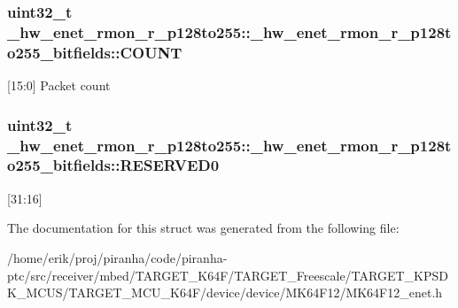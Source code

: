 \subsubsection[{\texorpdfstring{C\+O\+U\+NT}{COUNT}}]{\setlength{\rightskip}{0pt plus 5cm}uint32\+\_\+t \+\_\+hw\+\_\+enet\+\_\+rmon\+\_\+r\+\_\+p128to255\+::\+\_\+hw\+\_\+enet\+\_\+rmon\+\_\+r\+\_\+p128to255\+\_\+bitfields\+::\+C\+O\+U\+NT}\hypertarget{struct__hw__enet__rmon__r__p128to255_1_1__hw__enet__rmon__r__p128to255__bitfields_af3cc22b88abafadefec859c587a61730}{}\label{struct__hw__enet__rmon__r__p128to255_1_1__hw__enet__rmon__r__p128to255__bitfields_af3cc22b88abafadefec859c587a61730}
\mbox{[}15\+:0\mbox{]} Packet count 
\subsubsection[{\texorpdfstring{R\+E\+S\+E\+R\+V\+E\+D0}{RESERVED0}}]{\setlength{\rightskip}{0pt plus 5cm}uint32\+\_\+t \+\_\+hw\+\_\+enet\+\_\+rmon\+\_\+r\+\_\+p128to255\+::\+\_\+hw\+\_\+enet\+\_\+rmon\+\_\+r\+\_\+p128to255\+\_\+bitfields\+::\+R\+E\+S\+E\+R\+V\+E\+D0}\hypertarget{struct__hw__enet__rmon__r__p128to255_1_1__hw__enet__rmon__r__p128to255__bitfields_ad0b45b2278ff195acbb23c431d4ead53}{}\label{struct__hw__enet__rmon__r__p128to255_1_1__hw__enet__rmon__r__p128to255__bitfields_ad0b45b2278ff195acbb23c431d4ead53}
\mbox{[}31\+:16\mbox{]} 

The documentation for this struct was generated from the following file\+:\begin{DoxyCompactItemize}
\item 
/home/erik/proj/piranha/code/piranha-\/ptc/src/receiver/mbed/\+T\+A\+R\+G\+E\+T\+\_\+\+K64\+F/\+T\+A\+R\+G\+E\+T\+\_\+\+Freescale/\+T\+A\+R\+G\+E\+T\+\_\+\+K\+P\+S\+D\+K\+\_\+\+M\+C\+U\+S/\+T\+A\+R\+G\+E\+T\+\_\+\+M\+C\+U\+\_\+\+K64\+F/device/device/\+M\+K64\+F12/M\+K64\+F12\+\_\+enet.\+h\end{DoxyCompactItemize}
